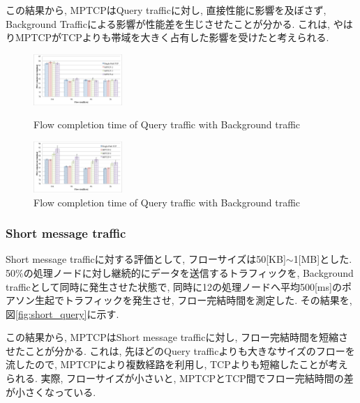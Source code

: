 \documentclass[10pt, a4paper, twocolumn]{jsarticle}
\begin{document}
この結果から, MPTCPはQuery trafficに対し, 直接性能に影響を及ぼさず, Background
Trafficによる影響が性能差を生じさせたことが分かる.
これは, やはりMPTCPがTCPよりも帯域を大きく占有した影響を受けたと考えられる.
\begin{figure}[h]
 \begin{minipage}{0.49\hsize}
  \begin{center}
    \includegraphics[autoebb, width=95pt]{./img/pure_query.pdf}
    \caption{Flow completion time of Query traffic with Background traffic}
    \label{fig:pure_query}
    \end{center}
 \end{minipage}
 \begin{minipage}{0.49\hsize}
  \begin{center}
    \includegraphics[autoebb, width=95pt]{./img/mix_query.pdf}
    \caption{Flow completion time of Query
    traffic with Background traffic}
    \label{fig:mix_query}
    \end{center}
 \end{minipage}
\end{figure}

\subsubsection{Short message traffic}
Short message trafficに対する評価として, フローサイズは50[KB]$\sim$1[MB]とした.
50\%の処理ノードに対し継続的にデータを送信するトラフィックを, Background trafficとして同時に発生させた状態で,
同時に12の処理ノードへ平均500[ms]のポアソン生起でトラフィックを発生させ, フロー完結時間を測定した.
その結果を, 図\ref{fig:short_query}に示す.

この結果から, MPTCPはShort message trafficに対し, フロー完結時間を短縮させたことが分かる.
これは, 先ほどのQuery trafficよりも大きなサイズのフローを流したので, MPTCPにより複数経路を利用し, TCPよりも短縮したことが考えられる.
実際, フローサイズが小さいと, MPTCPとTCP間でフロー完結時間の差が小さくなっている.
\end{document}
